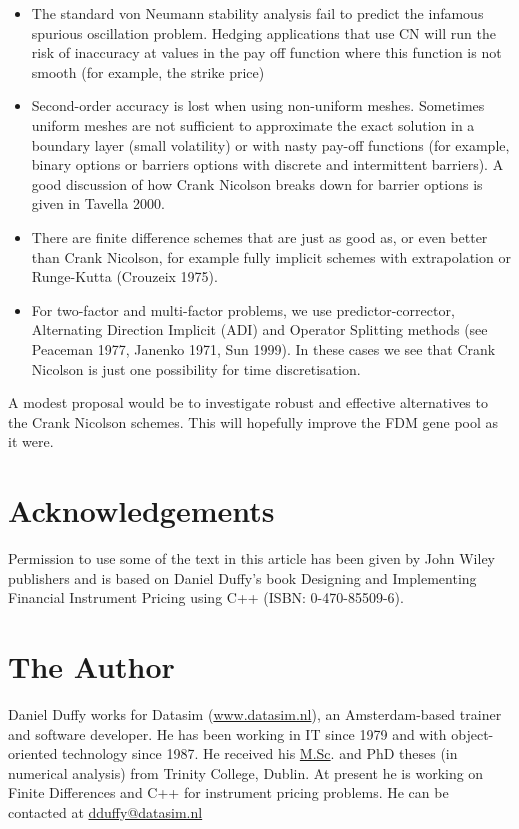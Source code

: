 \documentclass[10pt]{article}
\begin{document}
\begin{itemize}
  \item The standard von Neumann stability analysis fail to predict the infamous spurious oscillation problem. Hedging applications that use CN will run the risk of inaccuracy at values in the pay off function where this function is not smooth (for example, the strike price)
  \item Second-order accuracy is lost when using non-uniform meshes. Sometimes uniform meshes are not sufficient to approximate the exact solution in a boundary layer (small volatility) or with nasty pay-off functions (for example, binary options or barriers options with discrete and intermittent barriers). A good discussion of how Crank Nicolson breaks down for barrier options is given in Tavella 2000.
  \item There are finite difference schemes that are just as good as, or even better than Crank Nicolson, for example fully implicit schemes with extrapolation or Runge-Kutta (Crouzeix 1975).
  \item For two-factor and multi-factor problems, we use predictor-corrector, Alternating Direction Implicit (ADI) and Operator Splitting methods (see Peaceman 1977, Janenko 1971, Sun 1999). In these cases we see that Crank Nicolson is just one possibility for time discretisation.
\end{itemize}

A modest proposal would be to investigate robust and effective alternatives to the Crank Nicolson schemes. This will hopefully improve the FDM gene pool as it were.

\section*{Acknowledgements}
Permission to use some of the text in this article has been given by John Wiley publishers and is based on Daniel Duffy's book Designing and Implementing Financial Instrument Pricing using C++ (ISBN: 0-470-85509-6).

\section*{The Author}
Daniel Duffy works for Datasim (\href{http://www.datasim.nl}{www.datasim.nl}), an Amsterdam-based trainer and software developer. He has been working in IT since 1979 and with object-oriented technology since 1987. He received his \href{http://M.Sc}{M.Sc}. and PhD theses (in numerical analysis) from Trinity College, Dublin. At present he is working on Finite Differences and C++ for instrument pricing problems. He can be contacted at \href{mailto:dduffy@datasim.nl}{dduffy@datasim.nl}
\end{document}
